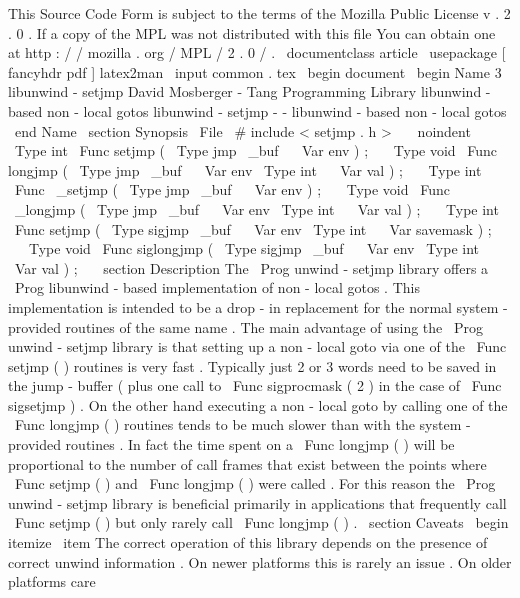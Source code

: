 %
This
Source
Code
Form
is
subject
to
the
terms
of
the
Mozilla
Public
%
License
v
.
2
.
0
.
If
a
copy
of
the
MPL
was
not
distributed
with
this
%
file
You
can
obtain
one
at
http
:
/
/
mozilla
.
org
/
MPL
/
2
.
0
/
.
\
documentclass
{
article
}
\
usepackage
[
fancyhdr
pdf
]
{
latex2man
}
\
input
{
common
.
tex
}
\
begin
{
document
}
\
begin
{
Name
}
{
3
}
{
libunwind
-
setjmp
}
{
David
Mosberger
-
Tang
}
{
Programming
Library
}
{
libunwind
-
based
non
-
local
gotos
}
libunwind
-
setjmp
-
-
libunwind
-
based
non
-
local
gotos
\
end
{
Name
}
\
section
{
Synopsis
}
\
File
{
\
#
include
<
setjmp
.
h
>
}
\
\
\
noindent
\
Type
{
int
}
\
Func
{
setjmp
}
(
\
Type
{
jmp
\
_buf
}
~
\
Var
{
env
}
)
;
\
\
\
Type
{
void
}
\
Func
{
longjmp
}
(
\
Type
{
jmp
\
_buf
}
~
\
Var
{
env
}
\
Type
{
int
}
~
\
Var
{
val
}
)
;
\
\
\
Type
{
int
}
\
Func
{
\
_setjmp
}
(
\
Type
{
jmp
\
_buf
}
~
\
Var
{
env
}
)
;
\
\
\
Type
{
void
}
\
Func
{
\
_longjmp
}
(
\
Type
{
jmp
\
_buf
}
~
\
Var
{
env
}
\
Type
{
int
}
~
\
Var
{
val
}
)
;
\
\
\
Type
{
int
}
\
Func
{
setjmp
}
(
\
Type
{
sigjmp
\
_buf
}
~
\
Var
{
env
}
\
Type
{
int
}
~
\
Var
{
savemask
}
)
;
\
\
\
Type
{
void
}
\
Func
{
siglongjmp
}
(
\
Type
{
sigjmp
\
_buf
}
~
\
Var
{
env
}
\
Type
{
int
}
~
\
Var
{
val
}
)
;
\
\
\
section
{
Description
}
The
\
Prog
{
unwind
-
setjmp
}
library
offers
a
\
Prog
{
libunwind
}
-
based
implementation
of
non
-
local
gotos
.
This
implementation
is
intended
to
be
a
drop
-
in
replacement
for
the
normal
system
-
provided
routines
of
the
same
name
.
The
main
advantage
of
using
the
\
Prog
{
unwind
-
setjmp
}
library
is
that
setting
up
a
non
-
local
goto
via
one
of
the
\
Func
{
setjmp
}
(
)
routines
is
very
fast
.
Typically
just
2
or
3
words
need
to
be
saved
in
the
jump
-
buffer
(
plus
one
call
to
\
Func
{
sigprocmask
}
(
2
)
in
the
case
of
\
Func
{
sigsetjmp
}
)
.
On
the
other
hand
executing
a
non
-
local
goto
by
calling
one
of
the
\
Func
{
longjmp
}
(
)
routines
tends
to
be
much
slower
than
with
the
system
-
provided
routines
.
In
fact
the
time
spent
on
a
\
Func
{
longjmp
}
(
)
will
be
proportional
to
the
number
of
call
frames
that
exist
between
the
points
where
\
Func
{
setjmp
}
(
)
and
\
Func
{
longjmp
}
(
)
were
called
.
For
this
reason
the
\
Prog
{
unwind
-
setjmp
}
library
is
beneficial
primarily
in
applications
that
frequently
call
\
Func
{
setjmp
}
(
)
but
only
rarely
call
\
Func
{
longjmp
}
(
)
.
\
section
{
Caveats
}
\
begin
{
itemize
}
\
item
The
correct
operation
of
this
library
depends
on
the
presence
of
correct
unwind
information
.
On
newer
platforms
this
is
rarely
an
issue
.
On
older
platforms
care
